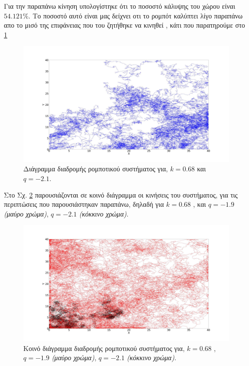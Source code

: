 Για την παραπάνω κίνηση υπολογίστηκε ότι το ποσοστό κάλυψης του χώρου είναι
$54.121 \% $. Το ποσοστό αυτό είναι μας δείχνει οτι το ρομπότ καλύπτει λίγο παραπάνω απο το μισό της επιφάνειας που του ζητήθηκε να κινηθεί  , κάτι που παρατηρούμε στο \ref{f:g76}

\begin{figure}[ht]
	\centering
	\includegraphics[width=1\linewidth]{LateX images/log/q/g2-2.1}
	\caption{Διάγραμμα διαδρομής ρομποτικού συστήματος για, $k = 0.68$ και $q = -2.1$.}
	\label{f:g76}	
\end{figure}


Στο Σχ. \ref{f:g77} παρουσιάζονται σε κοινό διάγραμμα οι κινήσεις του συστήματος, για τις
περιπτώσεις που παρουσιάστηκαν παραπάνω, δηλαδή για $k=0.68$ , και $q = -1.9$ \emph{(μαύρο χρώμα)}, $q = -2.1$  \emph{(κόκκινο χρώμα)}.

\begin{figure}[ht]
	\centering
	\includegraphics[width=1\linewidth]{LateX images/log/q/g3}
	\caption{Κοινό διάγραμμα διαδρομής ρομποτικού συστήματος για, $k = 0.68$ , $q = -1.9$ \emph{(μαύρο χρώμα)}, $q = -2.1$  \emph{(κόκκινο χρώμα)}.}
	\label{f:g77}	
\end{figure}

